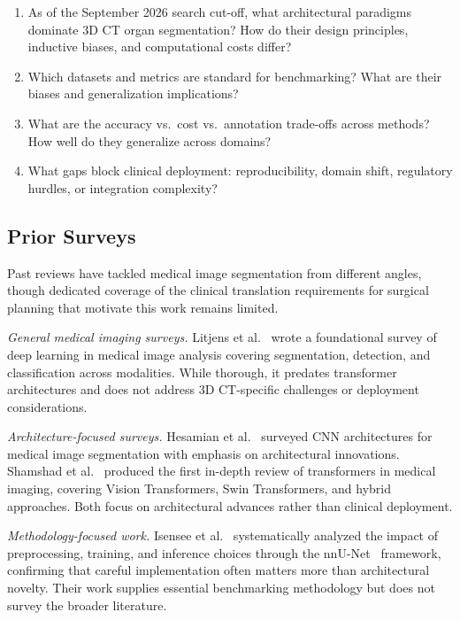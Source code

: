 \begin{enumerate}
    \item[\textbf{RQ1}:] As of the September 2026 search cut-off, what architectural paradigms dominate 3D CT organ segmentation? How do their design principles, inductive biases, and computational costs differ?
    
    \item[\textbf{RQ2}:] Which datasets and metrics are standard for benchmarking? What are their biases and generalization implications?
    
    \item[\textbf{RQ3}:] What are the accuracy vs.\ cost vs.\ annotation trade-offs across methods? How well do they generalize across domains?
    
    \item[\textbf{RQ4}:] What gaps block clinical deployment: reproducibility, domain shift, regulatory hurdles, or integration complexity?
\end{enumerate}

\subsection{Prior Surveys}

Past reviews have tackled medical image segmentation from different angles, though dedicated coverage of the clinical translation requirements for surgical planning that motivate this work remains limited.

\emph{General medical imaging surveys.} Litjens et al.\ \cite{litjens2017survey} wrote a foundational survey of deep learning in medical image analysis covering segmentation, detection, and classification across modalities. While thorough, it predates transformer architectures and does not address 3D CT-specific challenges or deployment considerations.

\emph{Architecture-focused surveys.} Hesamian et al.\ \cite{hesamian2019deep} surveyed CNN architectures for medical image segmentation with emphasis on architectural innovations. Shamshad et al.\ \cite{shamshad2023transformers} produced the first in-depth review of transformers in medical imaging, covering Vision Transformers, Swin Transformers, and hybrid approaches. Both focus on architectural advances rather than clinical deployment.

\emph{Methodology-focused work.} Isensee et al.\ \cite{isensee2021nnunet} systematically analyzed the impact of preprocessing, training, and inference choices through the nnU-Net~\cite{isensee2021nnunet} framework, confirming that careful implementation often matters more than architectural novelty. Their work supplies essential benchmarking methodology but does not survey the broader literature.

